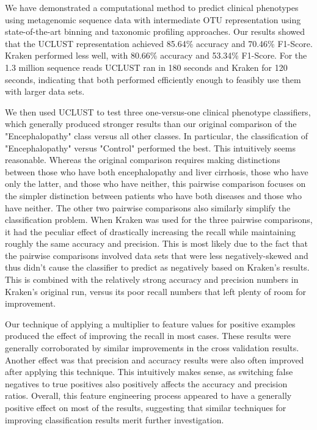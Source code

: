 
We have demonstrated a computational method 
to predict clinical phenotypes using metagenomic sequence data with intermediate 
OTU representation using state-of-the-art binning and taxonomic profiling approaches. 
%
%
Our results showed that 
the UCLUST representation 
achieved 85.64\% accuracy and 70.46\% F1-Score. Kraken performed less well, with 80.66\% accuracy and 53.34\% F1-Score. 
For the 1.3 million sequence reads UCLUST ran in 180 seconds and Kraken for 120 seconds, indicating that both performed efficiently enough to feasibly use them with larger data sets.

We then used UCLUST to test three one-versus-one clinical phenotype classifiers,
which generally produced stronger results than our original 
comparison of the "Encephalopathy" class versus all other 
classes. In particular, the classification of 
"Encephalopathy" versus "Control" performed the best. This intuitively seems reasonable. Whereas 
the original comparison requires making distinctions between 
those who have both encephalopathy and liver cirrhosis, those who have only the latter, and those who have neither, this pairwise comparison focuses on the simpler distinction 
between patients who have both diseases and those who have neither. The other two pairwise comparisons also similarly simplify the classification problem. When Kraken was used for the three pairwise comparisons, it had the peculiar effect of drastically increasing the recall while maintaining roughly the same accuracy and precision. This is most likely due to the fact that the pairwise comparisons involved data sets that were less negatively-skewed and thus didn't cause the classifier to predict as negatively based on Kraken's results. This is combined with the relatively strong accuracy and precision numbers in Kraken's original run, versus its poor recall numbers that left plenty of room for improvement.

Our technique of applying a multiplier to feature values for positive examples produced the effect of improving the recall in most cases. These results were generally corroborated by similar improvements in the cross validation results. Another effect was that precision and accuracy results were also often improved after applying this technique. This intuitively makes sense, as switching false negatives to true positives also positively affects the accuracy and precision ratios. Overall, this feature engineering process appeared to have a generally positive effect on most of the results, suggesting that similar techniques for improving classification results merit further investigation.

